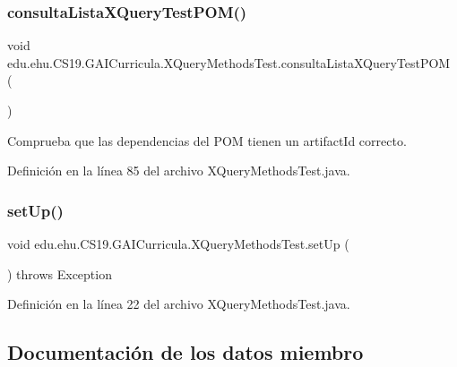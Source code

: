 \subsubsection{\texorpdfstring{consultaListaXQueryTestPOM()}{consultaListaXQueryTestPOM()}}
{\footnotesize\ttfamily void edu.\+ehu.\+C\+S19.\+G\+A\+I\+Curricula.\+X\+Query\+Methods\+Test.\+consulta\+Lista\+X\+Query\+Test\+P\+OM (\begin{DoxyParamCaption}{ }\end{DoxyParamCaption})}



Comprueba que las dependencias del P\+OM tienen un artifact\+Id correcto. 



Definición en la línea 85 del archivo X\+Query\+Methods\+Test.\+java.

\mbox{\label{classedu_1_1ehu_1_1_c_s19_1_1_g_a_i_curricula_1_1_x_query_methods_test_a7fea8bc0d25f1588cba324be6bcd088e}} 
\subsubsection{\texorpdfstring{setUp()}{setUp()}}
{\footnotesize\ttfamily void edu.\+ehu.\+C\+S19.\+G\+A\+I\+Curricula.\+X\+Query\+Methods\+Test.\+set\+Up (\begin{DoxyParamCaption}{ }\end{DoxyParamCaption}) throws Exception}



Definición en la línea 22 del archivo X\+Query\+Methods\+Test.\+java.



\subsection{Documentación de los datos miembro}
\mbox{\label{classedu_1_1ehu_1_1_c_s19_1_1_g_a_i_curricula_1_1_x_query_methods_test_aee6b73a3384d4b23a34648334a099b97}} 
